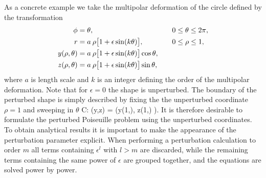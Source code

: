 As a concrete example we take the multipolar deformation of the
circle defined by the transformation
%
 \bsub
 \begin{alignat}{2}
 \eqlab{PertTransformPhi}
 \phi &= \theta,&&\quad 0 \leq \theta \leq 2\pi,\\
 \eqlab{PertTransformR}
 r  &= a\:\rho\big[1 + \epsilon \sin(k\theta)\big],&&\quad  0\leq\rho\leq 1,\\
 \eqlab{PertTransformY}
 y(\rho,\theta)  &= a\:\rho\big[1 + \epsilon \sin(k\theta)\big]\cos\theta,&&\\
 \eqlab{PertTransformZ}
 z(\rho,\theta)  &= a\:\rho\big[1 + \epsilon
 \sin(k\theta)\big]\sin\theta,&&
 \end{alignat}
 \esub
%
where $a$ is length scale and $k$ is an integer defining the order
of the multipolar deformation. Note that for $\epsilon=0$ the
shape is unperturbed. The boundary of the perturbed shape is
simply described by fixing the the unperturbed coordinate $\rho=1$
and sweeping in $\theta$
%
 \pp C: \quad \big(y,z\big) =
 \big(y(1,\theta),\: z(1,\theta) \big).
 \eeq
%
It is therefore desirable to formulate the perturbed Poiseuille
problem using the unperturbed coordinates. To obtain analytical
results it is important to make the appearance of the perturbation
parameter explicit. When performing a perturbation calculation to
order $m$ all terms containing $\epsilon^l$ with $l>m$ are
discarded, while the remaining terms containing the same power of
$\epsilon$ are grouped together, and the equations are solved
power by power.

